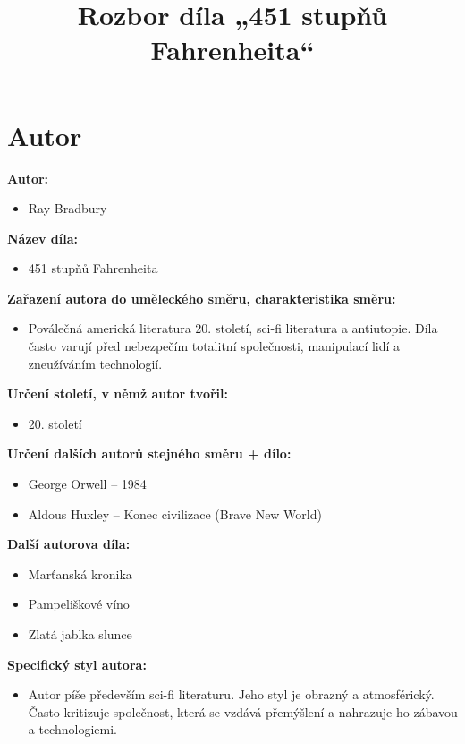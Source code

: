 \documentclass[12pt,a4paper]{article}
\title{\textbf{Rozbor díla „451 stupňů Fahrenheita“}}
\author{}
\date{}
\begin{document}
\maketitle

\section*{Autor}

\begin{tcolorbox}[breakable]

\textbf{Autor:}
\begin{itemize}
\item Ray Bradbury
\end{itemize}

\textbf{Název díla:}
\begin{itemize}
\item 451 stupňů Fahrenheita
\end{itemize}

\textbf{Zařazení autora do uměleckého směru, charakteristika směru:}
\begin{itemize}
\item Poválečná americká literatura 20. století, sci-fi literatura a antiutopie. 
Díla často varují před nebezpečím totalitní společnosti, manipulací lidí a zneužíváním technologií.
\end{itemize}

\textbf{Určení století, v němž autor tvořil:}
\begin{itemize}
\item 20. století
\end{itemize}

\textbf{Určení dalších autorů stejného směru + dílo:}
\begin{itemize}
\item George Orwell – 1984
\item Aldous Huxley – Konec civilizace (Brave New World)
\end{itemize}

\textbf{Další autorova díla:}
\begin{itemize}
\item Marťanská kronika
\item Pampeliškové víno
\item Zlatá jablka slunce
\end{itemize}

\textbf{Specifický styl autora:}
\begin{itemize}
\item Autor píše především sci-fi literaturu. Jeho styl je obrazný a atmosférický. 
Často kritizuje společnost, která se vzdává přemýšlení a nahrazuje ho zábavou a technologiemi.
\end{itemize}

\end{tcolorbox}
\end{document}
